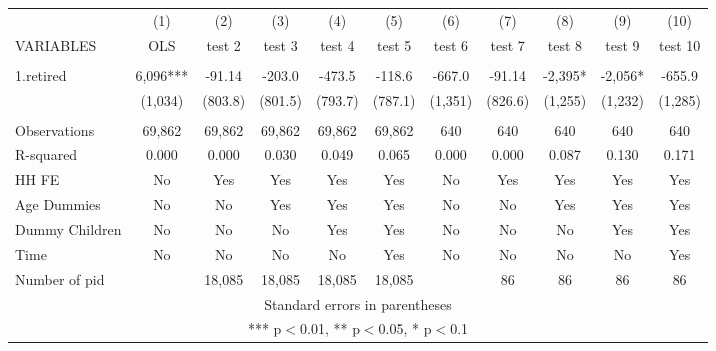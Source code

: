 \begin{tabular}{lcccccccccc} \hline
 & (1) & (2) & (3) & (4) & (5) & (6) & (7) & (8) & (9) & (10) \\
VARIABLES & OLS & test 2 & test 3 & test 4 & test 5 & test 6 & test 7 & test 8 & test 9 & test 10 \\ \hline
 &  &  &  &  &  &  &  &  &  &  \\
1.retired & 6,096*** & -91.14 & -203.0 & -473.5 & -118.6 & -667.0 & -91.14 & -2,395* & -2,056* & -655.9 \\
 & (1,034) & (803.8) & (801.5) & (793.7) & (787.1) & (1,351) & (826.6) & (1,255) & (1,232) & (1,285) \\
 &  &  &  &  &  &  &  &  &  &  \\
Observations & 69,862 & 69,862 & 69,862 & 69,862 & 69,862 & 640 & 640 & 640 & 640 & 640 \\
R-squared & 0.000 & 0.000 & 0.030 & 0.049 & 0.065 & 0.000 & 0.000 & 0.087 & 0.130 & 0.171 \\
HH FE & No & Yes & Yes & Yes & Yes & No & Yes & Yes & Yes & Yes \\
Age Dummies & No & No & Yes & Yes & Yes & No & No & Yes & Yes & Yes \\
Dummy Children & No & No & No & Yes & Yes & No & No & No & Yes & Yes \\
Time & No & No & No & No & Yes & No & No & No & No & Yes \\
 Number of pid &  & 18,085 & 18,085 & 18,085 & 18,085 &  & 86 & 86 & 86 & 86 \\ \hline
\multicolumn{11}{c}{ Standard errors in parentheses} \\
\multicolumn{11}{c}{ *** p$<$0.01, ** p$<$0.05, * p$<$0.1} \\
\end{tabular}
